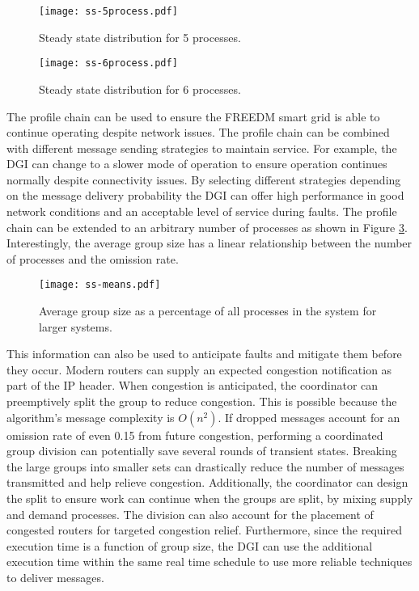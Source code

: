 \begin{figure}
    \centering
    \texttt{[image: ss-5process.pdf]}
    \caption{Steady state distribution for 5 processes.}
    \label{fig:ss-5process}
\end{figure}

\begin{figure}
    \centering
    \texttt{[image: ss-6process.pdf]}
    \caption{Steady state distribution for 6 processes.}
    \label{fig:ss-6process}
\end{figure}

The profile chain can be used to ensure the FREEDM smart grid is able to continue operating despite network issues.
The profile chain can be combined with different message sending strategies to maintain service.
For example, the DGI can change to a slower mode of operation to ensure operation continues normally despite connectivity issues.
By selecting different strategies depending on the message delivery probability the DGI can offer high performance in good network conditions and an acceptable level of service during faults.
The profile chain can be extended to an arbitrary number of processes as shown in Figure \ref{fig:ss-means}.
Interestingly, the average group size has a linear relationship between the number of processes and the omission rate.

\begin{figure}
    \centering
    \texttt{[image: ss-means.pdf]}
    \caption{Average group size as a percentage of all processes in the system for larger systems.}
    \label{fig:ss-means}
\end{figure}

This information can also be used to anticipate faults and mitigate them before they occur.
Modern routers can supply an expected congestion notification as part of the IP header\cite{ECN2}.
When congestion is anticipated, the coordinator can preemptively split the group to reduce congestion.
This is possible because the algorithm's message complexity is $O(n^2)$.
If dropped messages account for an omission rate of even 0.15 from future congestion, performing a coordinated group division can potentially save several rounds of transient states.
Breaking the large groups into smaller sets can drastically reduce the number of messages transmitted and help relieve congestion.
Additionally, the coordinator can design the split to ensure work can continue when the groups are split, by mixing supply and demand processes.
The division can also account for the placement of congested routers for targeted congestion relief.
Furthermore, since the required execution time is a function of group size, the DGI can use the additional execution time within the same real time schedule to use more reliable techniques to deliver messages.
